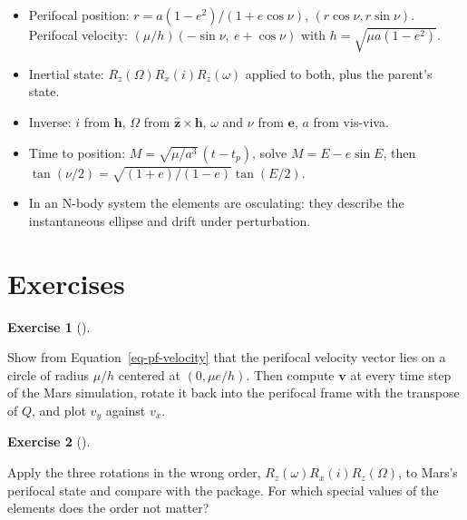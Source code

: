\documentclass[
  10.5pt,
  letterpaper,
]{scrbook}
\providecommand{\tightlist}{%
  \setlength{\itemsep}{0pt}\setlength{\parskip}{0pt}}
\theoremstyle{definition}
\newtheorem{exercise}{Exercise}[chapter]
\theoremstyle{plain}
\theoremstyle{remark}
\begin{document}
\begin{tcolorbox}[enhanced jigsaw, arc=.35mm, bottomrule=.15mm, bottomtitle=1mm, breakable, colback=white, colbacktitle=quarto-callout-tip-color!10!white, colframe=quarto-callout-tip-color-frame, coltitle=black, left=2mm, leftrule=.75mm, opacityback=0, opacitybacktitle=0.6, rightrule=.15mm, title={Key results}, titlerule=0mm, toprule=.15mm, toptitle=1mm]

\begin{itemize}
\tightlist
\item
  Perifocal position: \(r = a(1-e^2)/(1+e\cos\nu)\),
  \((r\cos\nu, r\sin\nu)\). Perifocal velocity:
  \((\mu/h)(-\sin\nu,\ e + \cos\nu)\) with \(h = \sqrt{\mu a(1-e^2)}\).
\item
  Inertial state: \(R_z(\Omega)R_x(i)R_z(\omega)\) applied to both, plus
  the parent's state.
\item
  Inverse: \(i\) from \(\mathbf{h}\), \(\Omega\) from
  \(\hat{\mathbf z}\times\mathbf{h}\), \(\omega\) and \(\nu\) from
  \(\mathbf{e}\), \(a\) from vis-viva.
\item
  Time to position: \(M = \sqrt{\mu/a^3}\,(t-t_p)\), solve
  \(M = E - e\sin E\), then
  \(\tan(\nu/2) = \sqrt{(1+e)/(1-e)}\tan(E/2)\).
\item
  In an N-body system the elements are osculating: they describe the
  instantaneous ellipse and drift under perturbation.
\end{itemize}

\end{tcolorbox}

\section*{Exercises}\label{exercises-6}


\begin{exercise}[]\protect\hypertarget{exr-ch7-hodograph}{}\label{exr-ch7-hodograph}

Show from Equation~\ref{eq-pf-velocity} that the perifocal velocity
vector lies on a circle of radius \(\mu/h\) centered at
\((0, \mu e/h)\). Then compute \(\mathbf{v}\) at every time step of the
Mars simulation, rotate it back into the perifocal frame with the
transpose of \(Q\), and plot \(v_y\) against \(v_x\).

\end{exercise}

\begin{exercise}[]\protect\hypertarget{exr-ch7-rotation-order}{}\label{exr-ch7-rotation-order}

Apply the three rotations in the wrong order,
\(R_z(\omega)R_x(i)R_z(\Omega)\), to Mars's perifocal state and compare
with the package. For which special values of the elements does the
order not matter?

\end{exercise}
\end{document}
